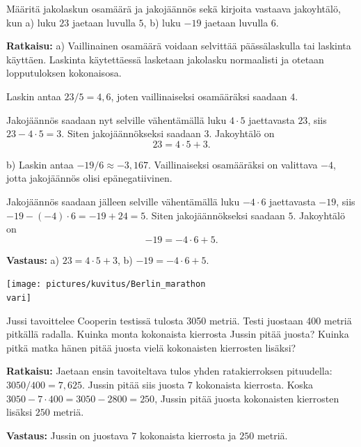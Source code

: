\begin{esimerkki}
Määritä jakolaskun osamäärä ja jakojäännös sekä kirjoita vastaava jakoyhtälö, kun
a) luku $23$ jaetaan luvulla $5$,  b)  luku $-19$ jaetaan luvulla $6$.

{\bf Ratkaisu:}
a) Vaillinainen osamäärä voidaan selvittää päässälaskulla tai laskinta käyttäen. Laskinta käytettäessä lasketaan jakolasku normaalisti ja otetaan lopputuloksen kokonaisosa.

Laskin antaa $23/5 = 4,6$, joten vaillinaiseksi osamääräksi saadaan $4$.

Jakojäännös saadaan nyt selville vähentämällä luku $4\cdot 5$ jaettavasta $23$, siis $23-4\cdot 5=3$. Siten jakojäännökseksi saadaan $3$. 
Jakoyhtälö on
\[
23 = 4\cdot 5 + 3.
\]

b) Laskin antaa $-19/6 \approx -3,167$. Vaillinaiseksi osamääräksi on valittava $-4$, jotta jakojäännös olisi epänegatiivinen.

Jakojäännös saadaan jälleen selville vähentämällä luku $-4\cdot 6$ jaettavasta $-19$, siis $-19-(-4)\cdot 6=-19+24=5$. Siten jakojäännökseksi saadaan $5$. 
Jakoyhtälö on
\[
-19 = -4\cdot 6 +5.
\]

{\bf Vastaus:} a) $23 = 4\cdot 5 + 3$, b) $-19 = -4\cdot 6 +5$.
\end{esimerkki}

\bigskip

\begin{center}
\texttt{[image: pictures/kuvitus/Berlin\_marathon\\vari]}
\end{center}


\begin{esimerkki}
Jussi tavoittelee Cooperin testissä tulosta 3050 metriä. Testi juostaan 400 metriä pitkällä
radalla. Kuinka monta kokonaista kierrosta Jussin pitää juosta? Kuinka pitkä matka
hänen pitää juosta vielä kokonaisten kierrosten lisäksi?

{\bf Ratkaisu:}
Jaetaan ensin tavoiteltava tulos yhden ratakierroksen pituudella:
$3050  / 400  = 7,625$. Jussin pitää siis juosta $7$ kokonaista kierrosta.
Koska $3050  - 7 \cdot 400 = 3050  - 2800  = 250$, Jussin pitää juosta kokonaisten kierrosten lisäksi $250$ metriä.

{\bf Vastaus:} Jussin on juostava $7$ kokonaista kierrosta ja $250$ metriä.
\end{esimerkki}


